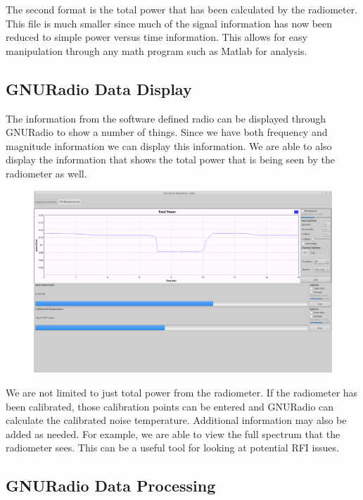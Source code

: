 The second format is the total power that has been calculated by the radiometer.  This file is much smaller since much of the signal information has now been reduced to simple power versus time information.  This allows for easy manipulation through any math program such as Matlab for analysis.  

\subsection{GNURadio Data Display}
The information from the software defined radio can be displayed through GNURadio to show a number of things.  Since we have both frequency and magnitude information we can display this information.  We are able to also display the information that shows the total power that is being seen by the radiometer as well.

{\begin{figure}[h!tb] 
\centering
\includegraphics[width=17cm]{Images/Lab1_TPR_at_end_exp.png}
\label{radiometer_tpr_display}
\end{figure}
}

We are not limited to just total power from the radiometer.  If the radiometer has been calibrated, those calibration points can be entered and GNURadio can calculate the calibrated noise temperature.  Additional information may also be added as needed.  For example, we are able to view the full spectrum that the radiometer sees.  This can be a useful tool for looking at potential RFI issues.    

\subsection{GNURadio Data Processing}

